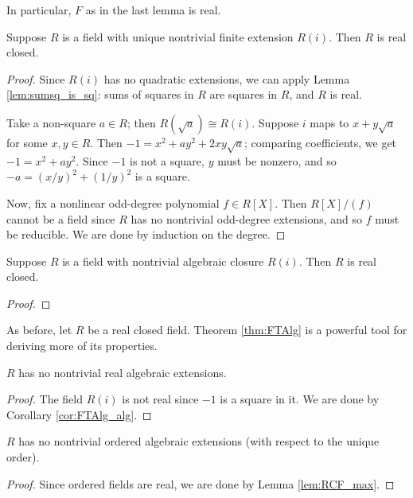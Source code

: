 In particular, $F$ as in the last lemma is real.

\begin{lemma}
  \label{lem:FTAlg_converse}
  \leanok
  Suppose $R$ is a field with unique nontrivial finite extension $R(i)$. Then $R$ is real closed.
\end{lemma}
\begin{proof}
  \leanok
  Since $R(i)$ has no quadratic extensions, we can apply Lemma \ref{lem:sumsq_is_sq}: sums of squares in $R$ are squares in $R$, and $R$ is real.

  Take a non-square $a\in R$; then $R(\sqrt{a})\cong R(i)$. Suppose $i$ maps to $x+y\sqrt{a}$ for some $x,y\in R$. Then $-1=x^2+ay^2+2xy\sqrt{a}$; comparing coefficients, we get $-1=x^2+ay^2$. Since $-1$ is not a square, $y$ must be nonzero, and so $-a=(x/y)^2+(1/y)^2$ is a square.

  Now, fix a nonlinear odd-degree polynomial $f\in R[X]$. Then $R[X]/(f)$ cannot be a field since $R$ has no nontrivial odd-degree extensions, and so $f$ must be reducible. We are done by induction on the degree.
\end{proof}

\begin{corollary}
  \label{lem:FTAlg_converse_alg_closure}
  \leanok
  Suppose $R$ is a field with nontrivial algebraic closure $R(i)$. Then $R$ is real closed.
\end{corollary}
\begin{proof}
  \leanok
\end{proof}

As before, let $R$ be a real closed field. Theorem \ref{thm:FTAlg} is a powerful tool for deriving more of its properties.

\begin{lemma}
  \label{lem:RCF_max}
  \leanok
  $R$ has no nontrivial real algebraic extensions.
\end{lemma}
\begin{proof}
  \leanok
  The field $R(i)$ is not real since $-1$ is a square in it. We are done by Corollary \ref{cor:FTAlg_alg}.
\end{proof}

\begin{corollary}
  \label{lem:RCF_max_ord}
  \leanok
  $R$ has no nontrivial ordered algebraic extensions (with respect to the unique order).
\end{corollary}
\begin{proof}
  \leanok
  Since ordered fields are real, we are done by Lemma \ref{lem:RCF_max}.
\end{proof}

